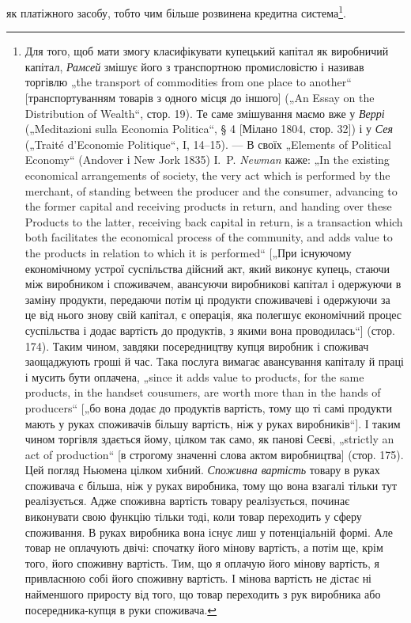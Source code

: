 як платіжного засобу, тобто чим більше розвинена кредитна система\footnote{
Для того, щоб мати змогу класифікувати купецький капітал як виробничий
капітал, \emph{Рамсей} змішує його з транспортною промисловістю і називав
торгівлю „the transport of commodities from one place to another“ [транспортуванням
товарів з одного місця до іншого] („An Essay on the Distribution of
Wealth“, стор. 19). Те саме змішування маємо вже у \emph{Веррі} („Meditazioni sulla
Economia Politica“, § 4 [Мілано 1804, стор. 32]) і у \emph{Сея} („Traité d’Economie
Politique“, I, 14--15). — В своїх „Elements of Political Economy“ (Andover і
New Jork 1835) І.~P. \emph{Newman} каже: „In the existing economical arrangements of
society, the very act which is performed by the merchant, of standing between the
producer and the consumer, advancing to the former capital and receiving products
in return, and handing over these Products to the latter, receiving back capital in
return, is a transaction which both facilitates the economical process of the community,
and adds value to the products in relation to which it is performed“ [„При існуючому
економічному устрої суспільства дійсний акт, який виконує купець,
стаючи між виробником і споживачем, авансуючи виробникові капітал і одержуючи
в заміну продукти, передаючи потім ці продукти споживачеві і одержуючи
за це від нього знову свій капітал, є операція, яка полегшує економічний
процес суспільства і додає вартість до продуктів, з якими вона проводилась“]
(стор. 174). Таким чином, завдяки посередництву купця виробник і споживач
заощаджують гроші й час. Така послуга вимагає авансування капіталу й праці
і мусить бути оплачена, „since it adds value to products, for the same products,
in the handset cousumers, are worth more than in the hands of producers“ [„бо вона
додає до продуктів вартість, тому що ті самі продукти мають у руках споживачів
більшу вартість, ніж у руках виробників“]. І таким чином торгівля
здається йому, цілком так само, як панові Сеєві, „strictly an act of production“
[в строгому значенні слова актом виробництва] (стор. 175). Цей погляд Ньюмена
цілком хибний. \emph{Споживна вартість} товару в руках споживача є більша, ніж у
руках виробника, тому що вона взагалі тільки тут реалізується. Адже споживна
вартість товару реалізується, починає виконувати свою функцію тільки тоді,
коли товар переходить у сферу споживання. В руках виробника вона існує лиш
у потенціальній формі. Але товар не оплачують двічі: спочатку його мінову
вартість, а потім ще, крім того, його споживну вартість. Тим, що я оплачую
його мінову вартість, я привласнюю собі його споживну вартість. І мінова вартість
не дістає ні найменшого приросту від того, що товар переходить з рук
виробника або посередника-купця в руки споживача.
}.

